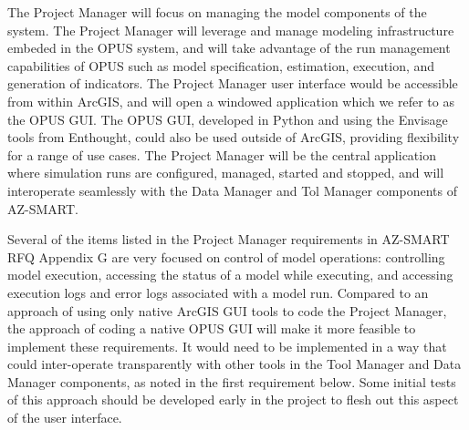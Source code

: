The Project Manager will focus on managing the model components of the system. The Project Manager will leverage and manage modeling infrastructure embeded in the OPUS system, and will take advantage of the run management capabilities of OPUS such as model specification, estimation, execution, and generation of indicators.  The Project Manager user interface would be accessible from within ArcGIS, and will open a windowed application which we refer to as the OPUS GUI.  The OPUS GUI, developed in Python and using the Envisage tools from Enthought, could also be used outside of ArcGIS, providing flexibility for a range of use cases.  The Project Manager will be the central application where simulation runs are configured, managed, started and stopped, and will interoperate seamlessly with the Data Manager and Tol Manager components of AZ-SMART.

Several of the items listed in the Project Manager requirements in AZ-SMART RFQ Appendix G are very focused on control of model operations: controlling model execution, accessing the status of a model while executing, and accessing execution logs and error logs associated with a model run.  Compared to an approach of using only native ArcGIS GUI tools to code the Project Manager, the approach of coding a native OPUS GUI will make it more feasible to implement these requirements.  It would need to be implemented in a way that could inter-operate transparently with other tools in the Tool Manager and Data Manager components, as noted in the first requirement below. Some initial tests of this approach should be developed early in the project to flesh out this aspect of the user interface.

